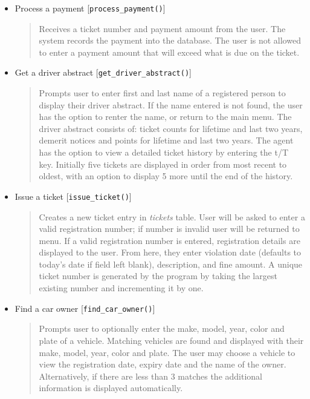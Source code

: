 \documentclass[10pt, a4paper]{article}
\begin{document}
{\begin{itemize}
\item Process a payment [\texttt{process\_payment()}]
	\begin{quotation}
	\noindent Receives a ticket number and payment amount from the user. The system records the payment into the database. The user is not allowed to enter a payment amount that will exceed what is due on the ticket.
	\end{quotation}

\item Get a driver abstract [\texttt{get\_driver\_abstract()}]
	\begin{quotation}
	\noindent Prompts user to enter first and last name of a registered person to display their driver abstract. If the name entered is not found, the user has the option to renter the name, or return to the main menu. The driver abstract consists of: ticket counts for lifetime and last two years, demerit notices and points for lifetime and last two years. The agent has the option to view a detailed ticket history by entering the t/T key. Initially five tickets are displayed in order from most recent to oldest, with an option to display 5 more until the end of the history.
	\end{quotation}

\item Issue a ticket [\texttt{issue\_ticket()}]
	\begin{quotation}
	\noindent Creates a new ticket entry in \emph{tickets} table. User will be asked to enter a valid registration number; if number is invalid user will be returned to menu. If a valid registration number is entered, registration details are displayed to the user. From here, they enter violation date (defaults to today's date if field left blank), description, and fine amount. A unique ticket number is generated by the program by taking the largest existing number and incrementing it by one. 
	\end{quotation}
\newpage
\item Find a car owner [\texttt{find\_car\_owner()}]
	\begin{quotation}
	\noindent Prompts user to optionally enter the make, model, year, color and plate of a vehicle. Matching vehicles are found and displayed with their make, model, year, color and plate. The user may choose a vehicle to view the registration date, expiry date and the name of the owner. Alternatively, if there are less than 3 matches the additional information is displayed automatically.
	\end{quotation}


\end{itemize}}
\end{document}
